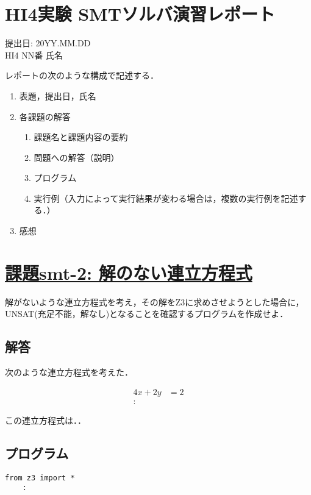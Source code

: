 \documentclass[12pt,fleqn]{jsarticle}
\begin{document}
\section*{HI4実験 SMTソルバ演習レポート}

\begin{flushright}
 提出日: 20YY.MM.DD \\
 HI4 NN番 氏名
\end{flushright}

{\color{blue}
\begin{boxnote}
レポートの次のような構成で記述する．
\begin{enumerate}
 \item 表題，提出日，氏名
 \item 各課題の解答
 \begin{enumerate}
 \item 課題名と課題内容の要約
 \item 問題への解答（説明）
 \item プログラム
 \item 実行例（入力によって実行結果が変わる場合は，複数の実行例を記述する．）
 \end{enumerate}
\item 感想
\end{enumerate}

\end{boxnote}
}

\section*{\underline{課題smt-2: 解のない連立方程式}}
解がないような連立方程式を考え，その解をZ3に求めさせようとした場合に，
UNSAT(充足不能，解なし)となることを確認するプログラムを作成せよ．

\subsection*{解答}

次のような連立方程式を考えた．

\begin{eqnarray*}
  4x  +  2y & =  2   \\
    :
\end{eqnarray*}

この連立方程式は．．


\subsection*{プログラム}
\begin{lstlisting}
from z3 import *
    :
\end{lstlisting}
\end{document}
